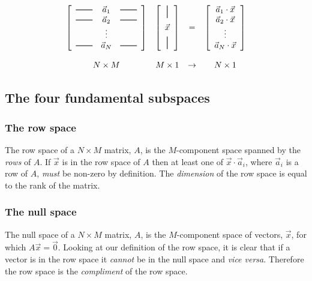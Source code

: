 \documentclass[a4paper]{article}
\newcommand{\hmatrixrule}{\rule[0.5ex]{2em}{0.7pt}}
\newcommand{\vmatrixrule}{\rule[-0.5ex]{0.7pt}{1.5em}}
\newcommand{\highlight}[1]{{\color{blue}#1}}
\begin{document}
\[
\begin{array}{cccc}
\left[
	\begin{array}{ccc}
		\hmatrixrule & \vec{a}_1 & \hmatrixrule \\
		\hmatrixrule & \vec{a}_2 & \hmatrixrule \\
		            & \vdots & \\
		\hmatrixrule & \vec{a}_N & \hmatrixrule
	\end{array}
\right] &
\left[
	\begin{array}{c}
		\vmatrixrule \\[1ex]
		\vec{x} \\[1ex]
		\vmatrixrule 
	\end{array}
\right] &
= &
\left[
	\begin{array}{c}
		\vec{a}_1 \cdot \vec{x} \\ \vec{a}_2 \cdot \vec{x} \\ \vdots \\ \vec{a}_N \cdot \vec{x}
	\end{array}
\right]
\\
\rule{0pt}{2em} N \times M & M \times 1 & \rightarrow & N \times 1
\end{array}
\]

\subsection{The four fundamental subspaces}

\subsubsection{The row space}

The row space of a $N \times M$ matrix, $A$, is \highlight{the $M$-component space
spanned by the \emph{rows} of $A$}. If $\vec{x}$ is in the row space of $A$
then at least one of $\vec{x} \cdot \vec{a}_i$, where $\vec{a}_i$ is a row of
$A$, \emph{must} be non-zero by definition. \highlight{The \emph{dimension} of the row
space is equal to the rank of the matrix.}

\subsubsection{The null space}

The null space of a $N \times M$ matrix, $A$, is the \highlight{$M$-component} space of
vectors, $\vec{x}$, for which \highlight{$A\vec{x} = \vec{0}$}. Looking at our
definition of the row space, it is clear that if a vector is in the row space
it \emph{cannot} be in the null space and \emph{vice versa}. Therefore the row
space is the \emph{compliment} of the row space.
\end{document}
